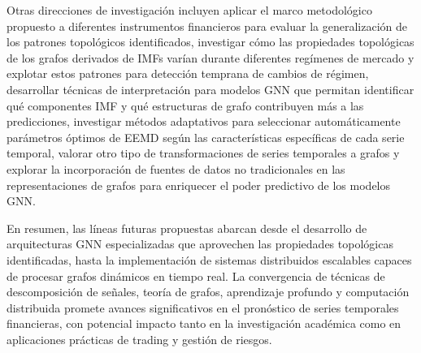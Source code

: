 \documentclass[11pt,a4paper]{article}
\begin{document}
Otras direcciones de investigación incluyen aplicar el marco metodológico propuesto a diferentes instrumentos financieros para evaluar la generalización de los patrones topológicos identificados, investigar cómo las propiedades topológicas de los grafos derivados de IMFs varían durante diferentes regímenes de mercado y explotar estos patrones para detección temprana de cambios de régimen, desarrollar técnicas de interpretación para modelos GNN que permitan identificar qué componentes IMF y qué estructuras de grafo contribuyen más a las predicciones, investigar métodos adaptativos para seleccionar automáticamente parámetros óptimos de EEMD según las características específicas de cada serie temporal, valorar otro tipo de transformaciones de series temporales a grafos y explorar la incorporación de fuentes de datos no tradicionales en las representaciones de grafos para enriquecer el poder predictivo de los modelos GNN.

En resumen, las líneas futuras propuestas abarcan desde el desarrollo de arquitecturas GNN especializadas que aprovechen las propiedades topológicas identificadas, hasta la implementación de sistemas distribuidos escalables capaces de procesar grafos dinámicos en tiempo real. La convergencia de técnicas de descomposición de señales, teoría de grafos, aprendizaje profundo y computación distribuida promete avances significativos en el pronóstico de series temporales financieras, con potencial impacto tanto en la investigación académica como en aplicaciones prácticas de trading y gestión de riesgos.
\end{document}
